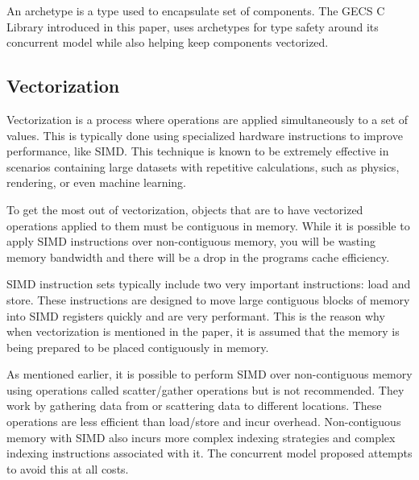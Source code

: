 An archetype is a type used to encapsulate set of components. The GECS C Library introduced in this paper, uses archetypes for type safety around its concurrent model while also helping keep components vectorized.

\subsection{Vectorization}
Vectorization is a process where operations are applied simultaneously to a set of values. This is typically done using specialized hardware instructions to improve performance, like SIMD. This technique is known to be extremely effective in scenarios containing large datasets with repetitive calculations, such as physics, rendering, or even machine learning. 

To get the most out of vectorization, objects that are to have vectorized operations applied to them must be contiguous in memory. While it is possible to apply SIMD instructions over non-contiguous memory, you will be wasting memory bandwidth and there will be a drop in the programs cache efficiency. 

SIMD instruction sets typically include two very important instructions: load and store. These instructions are designed to move large contiguous blocks of memory into SIMD registers quickly and are very performant. This is the reason why when vectorization is mentioned in the paper, it is assumed that the memory is being prepared to be placed contiguously in memory. 

As mentioned earlier, it is possible to perform SIMD over non-contiguous memory using operations called scatter/gather operations but is not recommended. They work by gathering data from or scattering data to different locations. These operations are less efficient than load/store and incur overhead. Non-contiguous memory with SIMD also incurs more complex indexing strategies and complex indexing instructions associated with it. The concurrent model proposed attempts to avoid this at all costs.

